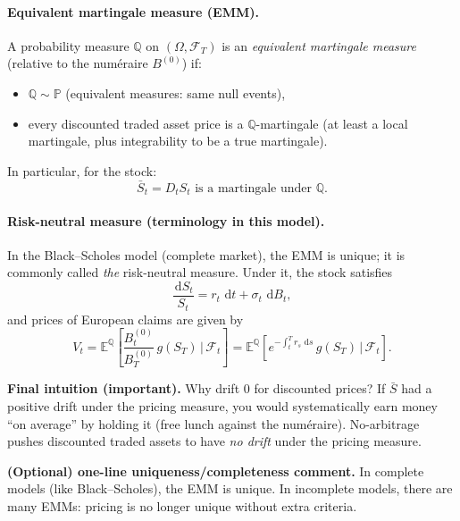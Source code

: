 \documentclass[11pt]{article}
\newcommand{\Pbb}{\mathbb{P}}
\newcommand{\Qbb}{\mathbb{Q}}
\newcommand{\E}{\mathbb{E}}
\newcommand{\dd}{\,\mathrm{d}}
\newcommand{\1}{\mathbf{1}}
\begin{document}
\paragraph{Equivalent martingale measure (EMM).}
A probability measure $\Qbb$ on $(\Omega,\mathcal F_T)$ is an \emph{equivalent martingale measure}
(relative to the num\'eraire $B^{(0)}$) if:
\begin{itemize}[leftmargin=1.8em, itemsep=0.2em]
\item $\Qbb \sim \Pbb$ (equivalent measures: same null events),
\item every discounted traded asset price is a $\Qbb$-martingale
(at least a local martingale, plus integrability to be a true martingale).
\end{itemize}
In particular, for the stock:
\[
\bar S_t=D_t S_t \text{ is a martingale under }\Qbb.
\]

\paragraph{Risk-neutral measure (terminology in this model).}
In the Black--Scholes model (complete market), the EMM is unique; it is commonly called
\emph{the} risk-neutral measure. Under it, the stock satisfies
\[
\frac{\dd S_t}{S_t}=r_t\,\dd t+\sigma_t\,\dd B_t,
\]
and prices of European claims are given by
\[
V_t
=
\E^{\Qbb}\!\left[\frac{B_t^{(0)}}{B_T^{(0)}}\,g(S_T)\,\Big|\,\mathcal F_t\right]
=
\E^{\Qbb}\!\left[e^{-\int_t^T r_s\,\dd s}\,g(S_T)\,\Big|\,\mathcal F_t\right].
\]


\textbf{Final intuition (important).}
Why drift $0$ for discounted prices?
If $\bar S$ had a positive drift under the pricing measure, you would systematically earn money
``on average'' by holding it (free lunch against the num\'eraire).
No-arbitrage pushes discounted traded assets to have \emph{no drift} under the pricing measure.



\textbf{(Optional) one-line uniqueness/completeness comment.}
In complete models (like Black--Scholes), the EMM is unique.
In incomplete models, there are many EMMs: pricing is no longer unique without extra criteria.
\end{document}
